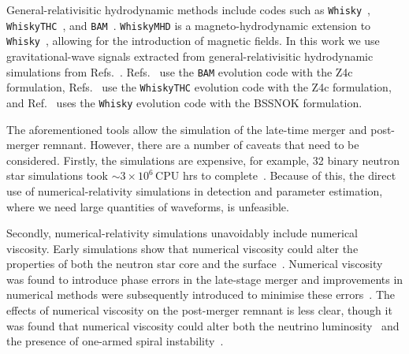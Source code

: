 \documentclass[../Thesis.tex]{subfiles}
\begin{document}
    
    General-relativisitic hydrodynamic methods include codes such as \texttt{Whisky}~\cite{Baiotti2005}, \texttt{WhiskyTHC}~\cite{Baiotti2005,Radice2014,Radice2014b,Radice2015}, and \texttt{BAM}~\cite{Brugmann2004,Brugmann2008,Thierfelder2011,Dietrich2015,Bernuzzi2016b,Dietrich2019a}. 
    \texttt{WhiskyMHD} is a magneto-hydrodynamic extension to \texttt{Whisky}~\cite{Giacomazzo2007,Giacomazzo2011,Giacomazzo2013}, allowing for the introduction of magnetic fields.
    In this work we use gravitational-wave signals extracted from general-relativisitic hydrodynamic simulations from Refs.~\cite{Bernuzzi2014,Rezzolla2016,Radice2016,Dietrich2017b,Radice2017,Radice2017a,Radice2018,Dietrich2018}. 
    Refs.~\cite{Bernuzzi2014,Dietrich2017b} use the \texttt{BAM}  evolution code with the Z4c formulation, Refs.~\cite{Radice2016,Radice2017,Radice2017a,Radice2018} use the \texttt{WhiskyTHC} evolution code with the Z4c formulation, and Ref.~\cite{Rezzolla2016} uses the \texttt{Whisky} evolution code with the BSSNOK formulation. \par %
    

    
    The aforementioned tools allow the simulation of the late-time merger and post-merger remnant.
    However, there are a number of caveats that need to be considered.
    Firstly, the simulations are expensive, for example, 32 binary neutron star simulations took  $\sim 3\times 10^6\,$CPU hrs to complete~\cite{Takami2015}.
    Because of this, the direct use of numerical-relativity simulations in detection and parameter estimation, where we need large quantities of waveforms, is unfeasible. \par
    Secondly, numerical-relativity simulations unavoidably include numerical viscosity.
    Early simulations show that numerical viscosity could alter the properties of both the neutron star core and the surface~\cite{Shibata2000bar,Cerda-Duran2010}.
    Numerical viscosity was found to introduce phase errors in the late-stage merger and improvements in numerical methods were subsequently introduced to minimise these errors~\cite{Radice2014}.
    The effects of numerical viscosity on the post-merger remnant is less clear, though it was found that numerical viscosity could alter both the neutrino luminosity~\cite{Sekiguchi2016} and the presence of one-armed spiral instability~\cite{Radice2016}.\par
\end{document}
